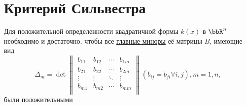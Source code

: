 \section{Критерий Сильвестра}
  \begin{thm} 
  Для положительной определенности квадратичной формы $k(x)$ в $\bbR^n$ необходимо и достаточно, чтобы все \underline{главные миноры} её матрицы $B$, имеющие вид
  \begin{equation}
  \Delta_m=\det \begin{Vmatrix}
  b_{11} & b_{12} & \cdots & b_{1m} \\
  b_{21} & b_{22} & \cdots & b_{2m} \\
  \vdots & \vdots & \ddots & \vdots \\
  b_{m1} & b_{m2} & \cdots & b_{mm} \\
  \end{Vmatrix}(b_{ij}=b_{ji} \forall i,j), m=\overline{1,n},
  \end{equation}
были положительными
  \end{thm}
